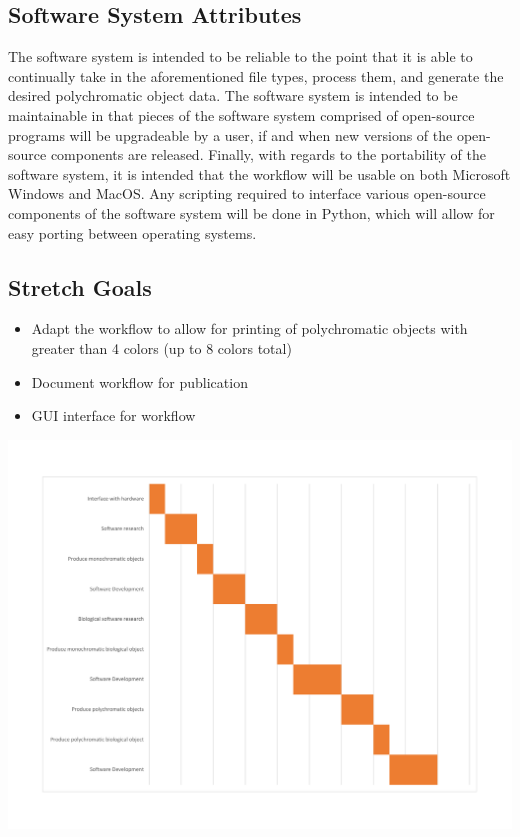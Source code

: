 \documentclass[letterpaper, onecolumn, draftclsnofoot, 10pt, compsoc]{IEEEtran}
\begin{document}
    \subsection{Software System Attributes}
    The software system is intended to be reliable to the point that it is able to continually take in the aforementioned file types, process them, and generate the desired polychromatic object data. 
    The software system is intended to be maintainable in that pieces of the software system comprised of open-source programs will be upgradeable by a user, if and when new versions of the open-source components are released. 
    Finally, with regards to the portability of the software system, it is intended that the workflow will be usable on both Microsoft Windows and MacOS. 
    Any scripting required to interface various open-source components of the software system will be done in Python, which will allow for easy porting between operating systems. 
    
    \subsection{Stretch Goals}
    \begin{itemize}
    	\item Adapt the workflow to allow for printing of polychromatic objects with greater than 4 colors (up to 8 colors total)
        \item Document workflow for publication
        \item GUI interface for workflow
    \end{itemize}

\newpage
{}
  \begin{center}
  \includegraphics{gantt}
  \end{center}
\end{document}
